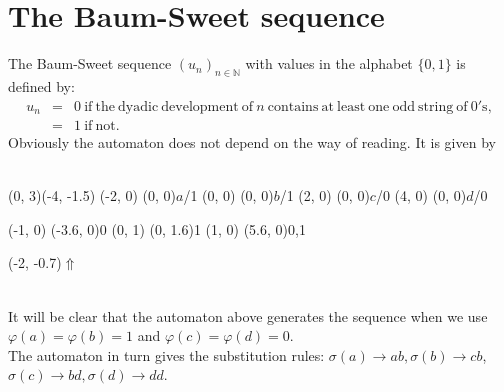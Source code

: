 \documentclass{article}
\begin{document}
\section*{The Baum-Sweet sequence}
The Baum-Sweet sequence $(u_n)_{n \in \mathbb{N}}$ with values in the alphabet
$\{0, 1\}$ is defined by:\\
\vbox{\begin{eqnarray*}
u_n &=& 0 \mathrm{\ if\ the\ dyadic\ development\ of\ } n
          \mathrm{\ contains\ at\ least\ one\ odd\ string\ of\ 0's},\\
    &=& 1 \mathrm{\ if\ not.}
\end{eqnarray*}}
Obviously the automaton does not depend on the way of reading. It is given by\\
\\
\begin{graph}(0, 3)(-4, -1.5)
  (-2, 0) (0, 0){$a$/1}
  (0, 0)  (0, 0){$b$/1}
  (2, 0)  (0, 0){$c$/0}
  (4, 0)  (0, 0){$d$/0}

  (-1, 0) \freetext(-3.6, 0){0}
   
   
  (0, 1) \freetext(0, 1.6){1}
   
   
  (1, 0) \freetext(5.6, 0){0,1}

  \freetext(-2, -0.7){$\Uparrow$}
\end{graph}\\
It will be clear that the automaton above generates the sequence when we use
$\varphi(a) = \varphi(b) = 1$ and $\varphi(c) = \varphi(d) = 0$.\\
The automaton in turn gives the substitution rules:
$\sigma(a) \to ab, \sigma(b) \to cb$,
$\sigma(c) \to bd, \sigma(d) \to dd$.
\end{document}
